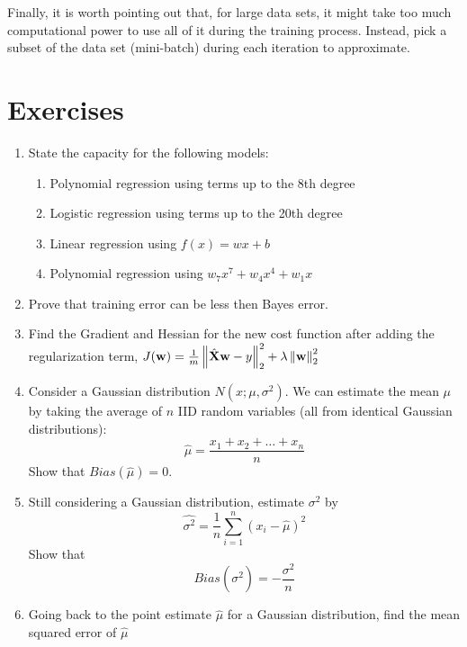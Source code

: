 Finally, it is worth pointing out that, for large data sets, it might take too much computational power to use all of it during the training process. Instead, pick a subset of the data set (mini-batch) during each iteration to approximate.


\section{Exercises}
\begin{enumerate}
    \item State the capacity for the following models:
    \begin{enumerate}
        \item Polynomial regression using terms up to the 8th degree
        \item Logistic regression using terms up to the 20th degree
        \item Linear regression using $f(x)=wx+b$
        \item Polynomial regression using $w_7x^7+w_4x^4+w_1x$
    \end{enumerate}
    \item Prove that training error can be less then Bayes error.
    \item Find the Gradient and Hessian for the new cost function after adding the regularization term, $J(\vw)=\frac{1}{m}\norm{\hat{\MX}\vw-y}_2^2+\lambda\norm{\vw}_2^2$
    \item Consider a Gaussian distribution $N(x; \mu, \sigma^{2})$. We can estimate the mean $\mu$ by taking the average of $n$ IID random variables (all from identical Gaussian distributions):
    \[\hat{\mu} = \frac{x_{1} + x_{2} + \ldots + x_{n}}{n} \]
    Show that $Bias(\hat{\mu}) = 0$.
    \item Still considering a Gaussian distribution, estimate $\sigma^{2}$ by
    \[\hat{\sigma^{2}} = \frac{1}{n} \sum_{i = 1}^{n}(x_{i} - \hat{\mu})^{2}\]
    Show that \[Bias(\hat{\sigma^{2}}) = - \frac{\sigma^{2}}{n} \]
    \item Going back to the point estimate $\hat{\mu}$ for a Gaussian distribution, find the mean squared error of $\hat{\mu}$
\end{enumerate}

